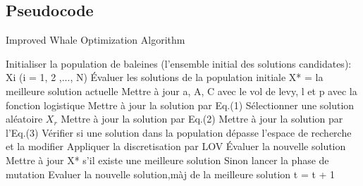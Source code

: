\documentclass[12pt]{article}
\begin{document}
\subsection{Pseudocode}
\begin{algorithm}[H]
    \caption{Improved Whale Optimization Algorithm}
    \begin{algorithmic}
        \STATE Initialiser la population de baleines (l'ensemble initial des solutions candidates): Xi (i = 1, 2 ,..., N)\;
        \STATE Évaluer les solutions de la population initiale\;
        \STATE X* = la meilleure solution actuelle\;
                \STATE Mettre à jour a, A, C avec le vol de levy, l et p avec la fonction logistique\;
                        \STATE Mettre à jour la solution par Eq.(1)\;
                    \ELSE
                        \STATE Sélectionner une solution aléatoire \(X_r\)\;
                        \STATE Mettre à jour la solution par Eq.(2)\;
                    \ENDIF
                \ELSE 
                    \STATE Mettre à jour la solution par l'Eq.(3)\;
                \ENDIF
            \ENDFOR
            \STATE Vérifier si une solution dans la population dépasse l'espace de recherche et la modifier\;
            \STATE Appliquer la discretisation par LOV\;
            \STATE Évaluer la nouvelle solution\;
            \STATE Mettre à jour X* s'il existe une meilleure solution Sinon lancer la phase de mutation\;
            \STATE Evaluer la nouvelle solution,màj de la meilleure solution
            \STATE t = t + 1\;
        \ENDWHILE
    \end{algorithmic}
\end{algorithm}
\end{document}
